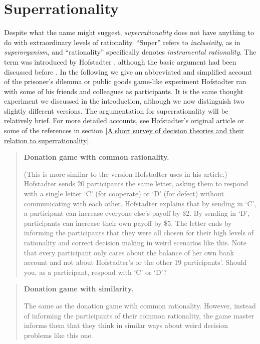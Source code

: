 \documentclass{book}
\begin{document}


\chapter{Superrationality} %
\label{Superrationality}

Despite what the name might suggest, \textit{superrationality} does not have anything to do with extraordinary levels of rationality. “Super” refers to \textit{inclusivity}, as in \textit{superorganism}, and “rationality” specifically denotes \textit{instrumental rationality}. The term was introduced by Hofstadter \parencite*{Hofstadter1983-az}, although the basic argument had been discussed before \parencite{Davis1977-iw}. In the following we give an abbreviated and simplified account of the prisoner’s dilemma or public goods game-like experiment Hofstadter ran with some of his friends and colleagues as participants. It is the same thought experiment we discussed in the introduction, although we now distinguish two slightly different versions. The argumentation for superrationality will be relatively brief. For more detailed accounts, see Hofstadter’s original article or some of the references in section \ref{A short survey of decision theories and their relation to superrationality}.

\begin{quote}
\hypertarget{donationgamecommonrationality}{\textbf{Donation game with common rationality.}} (This is more similar to the version Hofstadter uses in his article.) Hofstadter sends 20 participants the same letter, asking them to respond with a single letter ‘C’ (for cooperate) or ‘D’ (for defect) without communicating with each other. Hofstadter explains that by sending in ‘C’, a participant can increase everyone else’s payoff by \$2. By sending in ‘D’, participants can increase their own payoff by \$5. The letter ends by informing the participants that they were all chosen for their high levels of rationality and correct decision making in weird scenarios like this. Note that every participant only cares about the balance of her own bank account and not about Hofstadter’s or the other 19 participants’. Should you, as a participant, respond with ‘C’ or ‘D’?
\end{quote}
\begin{quote}
\hypertarget{donationgamesimilarity}{\textbf{Donation game with similarity.}} The same as the donation game with common rationality. However, instead of informing the participants of their common rationality, the game master informs them that they think in similar ways about weird decision problems like this one.
\end{quote}
\end{document}
